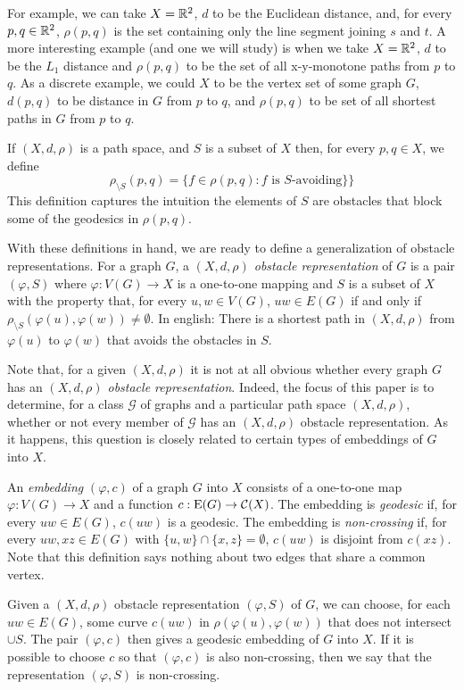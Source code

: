 \documentclass{patmorin}
\begin{document}
For example, we can take $X=\mathbb{R}^2$, $d$ to be the Euclidean distance,
and, for every $p,q\in\mathbb{R}^2$, $\rho(p,q)$ is the set containing only
the line segment joining $s$ and $t$.  A more interesting example
(and one we will study) is when we take $X=\mathbb{R}^2$, $d$ to be the $L_1$
distance and $\rho(p,q)$ to be the set of all x-y-monotone paths from
$p$ to $q$. As a discrete example, we could $X$ to be the vertex set
of some graph $G$, $d(p,q)$ to be distance in $G$ from $p$ to $q$, 
and $\rho(p,q)$ to be set of all shortest paths in $G$ from $p$ to $q$.

If $(X,d,\rho)$ is a path space, and $S$ is a subset of $X$ then, for
every $p,q\in X$, we define
\[
    \rho_{\setminus S}(p,q) = \{f\in\rho(p,q) : \text{$f$ is $S$-avoiding} \}  \}
\]
This definition captures the intuition the elements of $S$ are obstacles
that block some of the geodesics in $\rho(p,q)$.

With these definitions in hand, we are ready to define a generalization of
obstacle representations.  For a graph $G$, a \emph{$(X,d,\rho)$ obstacle
representation} of $G$ is a pair $(\varphi, S)$ where $\varphi:V(G)\to X$
is a one-to-one mapping and $S$ is a subset of $X$ with the property that,
for every $u,w\in V(G)$, $uw\in E(G)$ if and only if $\rho_{\setminus
S}(\varphi(u),\varphi(w))\neq\emptyset$. In english: There is a shortest
path in $(X,d,\rho)$ from $\varphi(u)$ to $\varphi(w)$ that avoids the
obstacles in $S$.

Note that, for a given $(X,d,\rho)$ it is not at all obvious whether every
graph $G$ has an \emph{$(X,d,\rho)$ obstacle representation}.  Indeed,
the focus of this paper is to determine, for a class $\mathcal{G}$ of
graphs and a particular path space $(X,d,\rho)$, whether or not every
member of $\mathcal{G}$ has an $(X,d,\rho)$ obstacle representation.
As it happens, this question is closely related to certain types of
embeddings of $G$ into $X$.

An \emph{embedding} $(\varphi,c)$ of a graph $G$ into $X$ consists
of a one-to-one map $\varphi:V(G)\to X$ and a function $c:\mathrm{E}(G)\to
\mathcal{C}(X)$.  The embedding is \emph{geodesic} if, for every $uw\in
E(G)$, $c(uw)$ is a geodesic.  The embedding is \emph{non-crossing} if,
for every $uw,xz\in E(G)$ with $\{u,w\}\cap \{x,z\}=\emptyset$, $c(uw)$
is disjoint from $c(xz)$.  Note that this definition says nothing about
two edges that share a common vertex.

Given a $(X,d,\rho)$ obstacle representation $(\varphi,S)$ of
$G$, we can choose, for each $uw\in E(G)$, some curve $c(uw)$ in
$\rho(\varphi(u),\varphi(w))$ that does not intersect $\cup S$.  The pair
$(\varphi,c)$ then gives a geodesic embedding of $G$ into $X$.  If it
is possible to choose $c$ so that $(\varphi,c)$ is also non-crossing,
then we say that the representation $(\varphi,S)$ is non-crossing.
\end{document}
